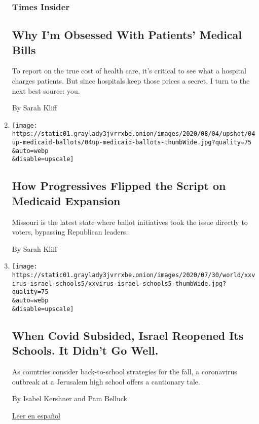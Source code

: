 \begin{enumerate}
  \hypertarget{times-insider}{%
  \subsubsection{Times Insider}\label{times-insider}}

  \hypertarget{why-im-obsessed-with-patients-medical-bills}{%
  \subsection{Why I'm Obsessed With Patients' Medical
  Bills}\label{why-im-obsessed-with-patients-medical-bills}}

  To report on the true cost of health care, it's critical to see what a
  hospital charges patients. But since hospitals keep those prices a
  secret, I turn to the next best source: you.

  By Sarah Kliff
\item
  \href{/2020/08/04/upshot/missouri-election-medicaid-expansion.html}{}

  \texttt{[image: https://static01.graylady3jvrrxbe.onion/images/2020/08/04/upshot/04up-medicaid-ballots/04up-medicaid-ballots-thumbWide.jpg?quality=75\\\&auto=webp\\\&disable=upscale]}

  \hypertarget{how-progressives-flipped-the-script-on-medicaid-expansion}{%
  \subsection{How Progressives Flipped the Script on Medicaid
  Expansion}\label{how-progressives-flipped-the-script-on-medicaid-expansion}}

  Missouri is the latest state where ballot initiatives took the issue
  directly to voters, bypassing Republican leaders.

  By Sarah Kliff
\item
  \href{/2020/08/04/world/middleeast/coronavirus-israel-schools-reopen.html}{}

  \texttt{[image: https://static01.graylady3jvrrxbe.onion/images/2020/07/30/world/xxvirus-israel-schools5/xxvirus-israel-schools5-thumbWide.jpg?quality=75\\\&auto=webp\\\&disable=upscale]}

  \hypertarget{when-covid-subsided-israel-reopened-its-schools-it-didnt-go-well}{%
  \subsection{When Covid Subsided, Israel Reopened Its Schools. It
  Didn't Go
  Well.}\label{when-covid-subsided-israel-reopened-its-schools-it-didnt-go-well}}

  As countries consider back-to-school strategies for the fall, a
  coronavirus outbreak at a Jerusalem high school offers a cautionary
  tale.

  By Isabel Kershner and Pam Belluck

  \href{https://www.nytimes3xbfgragh.onion/es/2020/08/06/espanol/mundo/abrir-escuelas-israel-coronavirus.html}{Leer
  en español}
\end{enumerate}

